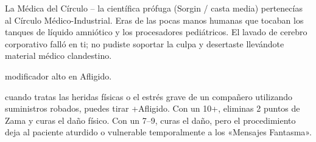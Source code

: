 \begin{FichaArquetipo}{La Médica del Círculo -- la científica prófuga (Sorgin / casta media)}
 pertenecías al Círculo Médico-Industrial. Eras de las pocas manos humanas que tocaban los tanques de líquido amniótico y los procesadores pediátricos. El lavado de cerebro corporativo falló en ti; no pudiste soportar la culpa y desertaste llevándote material médico clandestino.\par
{} modificador alto en Afligido.\par
{} cuando tratas las heridas físicas o el estrés grave de un compañero utilizando suministros robados, puedes tirar +Afligido. Con un 10+, eliminas 2 puntos de Zama y curas el daño físico. Con un 7--9, curas el daño, pero el procedimiento deja al paciente aturdido o vulnerable temporalmente a los «Mensajes Fantasma».
\end{FichaArquetipo}
